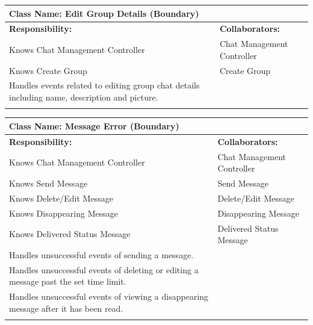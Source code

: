 \documentclass[]{article}
\begin{document}
\begin{itemize}
   	\begin{table}[ht]
		\centering
		\begin{tabular}{|p{7cm}|p{7cm}|}
		\hline 
		\multicolumn{2}{|l|}{\textbf{Class Name:} Edit Group Details (Boundary)} \\
		\hline
		\textbf{Responsibility:} & \textbf{Collaborators:} \\
		\hline
  			Knows Chat Management Controller & Chat Management Controller \\
			Knows Create Group & Create Group \\
			Handles events related to editing group chat details including name, description and picture. &\\
		\vspace{1in} & \\
		\hline
		\end{tabular}
	\end{table}

    	\begin{table}[ht]
		\centering
		\begin{tabular}{|p{7cm}|p{7cm}|}
		\hline 
		\multicolumn{2}{|l|}{\textbf{Class Name:} Message Error (Boundary)} \\
		\hline
		\textbf{Responsibility:} & \textbf{Collaborators:} \\
		\hline
  			Knows Chat Management Controller & Chat Management Controller \\
			Knows Send Message & Send Message \\
			Knows Delete/Edit Message & Delete/Edit Message \\
			Knows Disappearing Message & Disappearing Message \\
			Knows Delivered Status Message & Delivered Status Message \\
   			Handles unsuccessful events of sending a message. &\\
			Handles unsuccessful events of deleting or editing a message past the set time limit. &\\
			Handles unsuccessful events of viewing a disappearing message after it has been read. &\\
		\vspace{1in} & \\
		\hline
		\end{tabular}
	\end{table}


\end{itemize}
\end{document}
